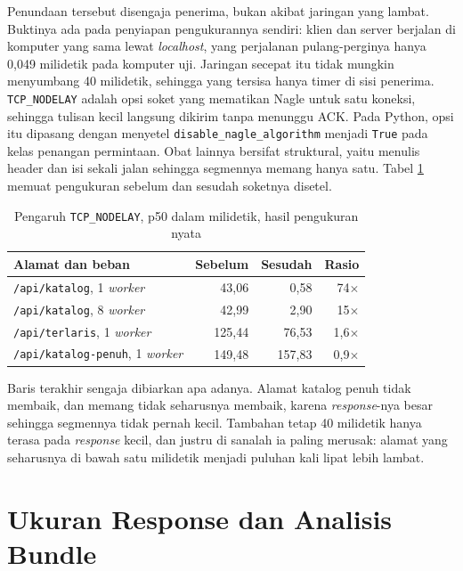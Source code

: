 Penundaan tersebut disengaja penerima, bukan akibat jaringan yang lambat.
Buktinya ada pada penyiapan pengukurannya sendiri: klien dan server berjalan
di komputer yang sama lewat \textit{localhost}, yang perjalanan
pulang-perginya hanya 0,049 milidetik pada komputer uji. Jaringan secepat itu
tidak mungkin menyumbang 40 milidetik, sehingga yang tersisa hanya timer di
sisi penerima. \texttt{TCP\_NODELAY} adalah opsi soket yang mematikan Nagle untuk satu
koneksi, sehingga tulisan kecil langsung dikirim tanpa menunggu ACK. Pada
Python, opsi itu dipasang dengan menyetel \texttt{disable\_nagle\_algorithm}
menjadi \texttt{True} pada kelas penangan permintaan. Obat lainnya bersifat
struktural, yaitu menulis header dan isi sekali jalan sehingga segmennya
memang hanya satu. Tabel \ref{tab:nagle} memuat pengukuran sebelum dan
sesudah soketnya disetel.

\begin{table}[!htb]
  \centering
  \caption{Pengaruh \texttt{TCP\_NODELAY}, p50 dalam milidetik, hasil
           pengukuran nyata}
  \label{tab:nagle}
  \begin{tabularx}{\textwidth}{Xrrr}
    \hline
    \textbf{Alamat dan beban} & \textbf{Sebelum} & \textbf{Sesudah} & \textbf{Rasio} \\
    \hline
    \texttt{/api/katalog}, 1 \textit{worker} & 43,06 & 0,58 & 74$\times$ \\
    \hline
    \texttt{/api/katalog}, 8 \textit{worker} & 42,99 & 2,90 & 15$\times$ \\
    \hline
    \texttt{/api/terlaris}, 1 \textit{worker} & 125,44 & 76,53 & 1,6$\times$ \\
    \hline
    \texttt{/api/katalog-penuh}, 1 \textit{worker} & 149,48 & 157,83 & 0,9$\times$ \\
    \hline
  \end{tabularx}
\end{table}

Baris terakhir sengaja dibiarkan apa adanya. Alamat katalog penuh tidak
membaik, dan memang tidak seharusnya membaik, karena \textit{response}-nya besar sehingga
segmennya tidak pernah kecil. Tambahan tetap 40 milidetik hanya terasa pada
\textit{response} kecil, dan justru di sanalah ia paling merusak: alamat yang
seharusnya di bawah satu milidetik menjadi puluhan kali lipat lebih lambat.

\section{Ukuran Response dan Analisis Bundle}

